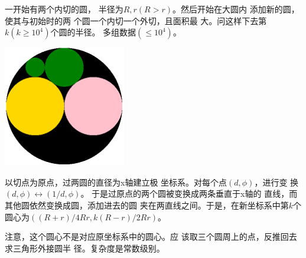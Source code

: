 \begin{prob}
	一开始有两个内切的圆，
	半径为$R,r(R>r)$。然后开始在大圆内
	添加新的圆，使其与初始时的两
	个圆一个内切一个外切，且面积最
	大。问这样下去第$k(k \ge 10^4)$个圆的半径。
	多组数据$(\le 10^4)$。
	\begin{center}
		\includegraphics[scale=1]{77E.png}
	\end{center}
\end{prob}

\begin{sol}
	以切点为原点，过两圆的直径为x轴建立极
	坐标系。对每个点$(d,\phi)$，进行变
	换$(d,\phi) \leftrightarrow (1/d,\phi)$。
	于是过原点的两个圆被变换成两条垂直于x轴的
	直线，而其他圆依然变换成圆，添加进去的圆
	夹在两直线之间。于是，在新坐标系中第$k$个
	圆心为$((R+r)/4Rr,k(R-r)/2Rr)$。
	\par
	注意，这个圆心不是对应原坐标系中的圆心。应
	该取三个圆周上的点，反推回去求三角形外接圆半
	径。复杂度是常数级别。
\end{sol}
